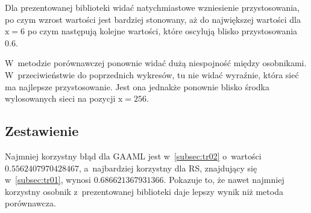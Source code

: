 Dla prezentowanej biblioteki widać
natychmiastowe wzniesienie przystosowania,
po czym wzrost wartości jest bardziej stonowany,
aż do największej wartości dla $\text{x}=6$
po czym następują kolejne wartości,
które oscylują blisko przystosowania $0.6$.

W~metodzie porównawczej ponownie
widać dużą niespojność między osobnikami.
W~przeciwieństwie do poprzednich wykresów,
tu nie widać wyraźnie,
która sieć ma najlepsze przystosowanie.
Jest ona jednakże ponownie blisko środka
wylosowanych sieci na pozycji $\text{x}=256$.

\subsection{Zestawienie}
\label{subsec:tr01-03}
Najmniej korzystny błąd dla \gls{GAAML} jest
w~\cref{subsec:tr02} o~wartości $0.5562407970428467$,
a~najbardziej korzystny dla \gls{RS},
znajdujący się w~\cref{subsec:tr01},
wynosi $0.686621367931366$.
Pokazuje to, że nawet najmniej korzystny
osobnik z~prezentowanej biblioteki daje
lepszy wynik niż metoda porównawcza.
